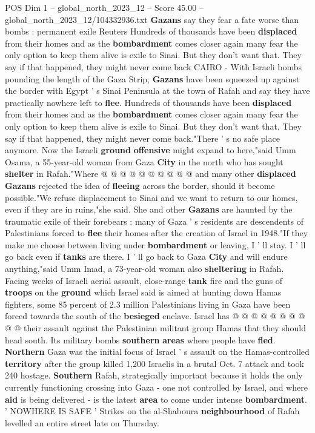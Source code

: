 \begin{textsample}{POS Dim 1 – global\_north\_2023\_12 – Score 45.00 – global\_north\_2023\_12/104332936.txt}  \label{ex:f1_pos_086}
\textbf{Gazans} say they fear a fate worse than bombs : permanent exile Reuters Hundreds of thousands have been \textbf{displaced} from their homes and as the \textbf{bombardment} comes closer again many fear the only option to keep them alive is exile to Sinai.
But they don't want that.
They say if that happened, they might never come back CAIRO - With Israeli bombs pounding the length of the Gaza Strip, \textbf{Gazans} have been squeezed up against the border with Egypt ' s Sinai Peninsula at the town of Rafah and say they have practically nowhere left to \textbf{flee}.
Hundreds of thousands have been \textbf{displaced} from their homes and as the \textbf{bombardment} comes closer again many fear the only option to keep them alive is exile to Sinai.
But they don't want that.
They say if that happened, they might never come back."There ' s no safe place anymore.
Now the Israeli \textbf{ground} \textbf{offensive} might expand to here,"said Umm Osama, a 55-year-old woman from Gaza \textbf{City} in the north who has sought \textbf{shelter} in Rafah."Where @ @ @ @ @ @ @ @ @ @ and many other \textbf{displaced} \textbf{Gazans} rejected the idea of \textbf{fleeing} across the border, should it become possible."We refuse displacement to Sinai and we want to return to our homes, even if they are in ruins,"she said.
She and other \textbf{Gazans} are haunted by the traumatic exile of their forebears : many of Gaza ' s residents are descendents of Palestinians forced to \textbf{flee} their homes after the creation of Israel in 1948."If they make me choose between living under \textbf{bombardment} or leaving, I ' ll stay.
I ' ll go back even if \textbf{tanks} are there.
I ' ll go back to Gaza \textbf{City} and will endure anything,"said Umm Imad, a 73-year-old woman also \textbf{sheltering} in Rafah.
Facing weeks of Israeli aerial assault, close-range \textbf{tank} fire and the guns of \textbf{troops} on the \textbf{ground} which Israel said is aimed at hunting down Hamas fighters, some 85 percent of 2.3 million Palestinians living in Gaza have been forced towards the south of the \textbf{besieged} enclave.
Israel has @ @ @ @ @ @ @ @ @ @ their assault against the Palestinian militant group Hamas that they should head south.
Its military bombs \textbf{southern} \textbf{areas} where people have \textbf{fled}. \textbf{Northern} Gaza was the initial focus of Israel ' s assault on the Hamas-controlled \textbf{territory} after the group killed 1,200 Israelis in a brutal Oct. 7 attack and took 240 hostage. \textbf{Southern} Rafah, strategically important because it holds the only currently functioning crossing into Gaza - one not controlled by Israel, and where \textbf{aid} is being delivered - is the latest \textbf{area} to come under intense \textbf{bombardment}. ' NOWHERE IS SAFE ' Strikes on the al-Shaboura \textbf{neighbourhood} of Rafah levelled an entire street late on Thursday.

\end{textsample}
